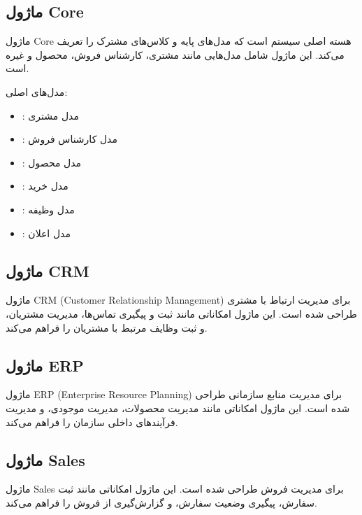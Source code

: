 \documentclass[letterpaper,10pt,english]{sphinxmanual}
\begin{document}
\subsection{ماژول Core}
\label{\detokenize{modules/index:core}}
\sphinxAtStartPar
ماژول Core هسته اصلی سیستم است که مدل‌های پایه و کلاس‌های مشترک را تعریف می‌کند. این ماژول شامل مدل‌هایی مانند مشتری، کارشناس فروش، محصول و غیره است.

\sphinxAtStartPar
مدل‌های اصلی:
\begin{itemize}
\item {} 
\sphinxAtStartPar
{}: مدل مشتری

\item {} 
\sphinxAtStartPar
{}: مدل کارشناس فروش

\item {} 
\sphinxAtStartPar
{}: مدل محصول

\item {} 
\sphinxAtStartPar
{}: مدل خرید

\item {} 
\sphinxAtStartPar
{}: مدل وظیفه

\item {} 
\sphinxAtStartPar
{}: مدل اعلان

\end{itemize}


\subsection{ماژول CRM}
\label{\detokenize{modules/index:crm}}
\sphinxAtStartPar
ماژول CRM (Customer Relationship Management) برای مدیریت ارتباط با مشتری طراحی شده است. این ماژول امکاناتی مانند ثبت و پیگیری تماس‌ها، مدیریت مشتریان، و ثبت وظایف مرتبط با مشتریان را فراهم می‌کند.


\subsection{ماژول ERP}
\label{\detokenize{modules/index:erp}}
\sphinxAtStartPar
ماژول ERP (Enterprise Resource Planning) برای مدیریت منابع سازمانی طراحی شده است. این ماژول امکاناتی مانند مدیریت محصولات، مدیریت موجودی، و مدیریت فرآیندهای داخلی سازمان را فراهم می‌کند.


\subsection{ماژول Sales}
\label{\detokenize{modules/index:sales}}
\sphinxAtStartPar
ماژول Sales برای مدیریت فروش طراحی شده است. این ماژول امکاناتی مانند ثبت سفارش، پیگیری وضعیت سفارش، و گزارش‌گیری از فروش را فراهم می‌کند.
\end{document}
